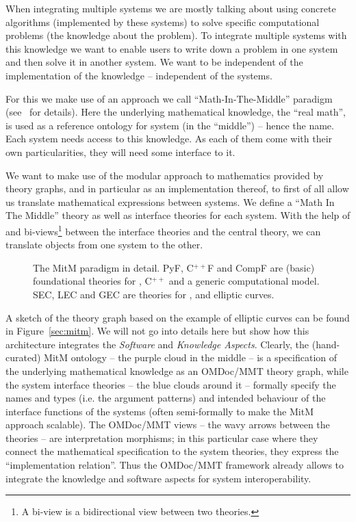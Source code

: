 When integrating multiple systems we are mostly talking about using concrete algorithms
(implemented by these systems) to solve specific computational problems (the knowledge
about the problem). To integrate multiple systems with this knowledge we want to enable
users to write down a problem in one system and then solve it in another system. We want
to be independent of the implementation of the knowledge -- independent of the systems.

For this we make use of an approach we call ``Math-In-The-Middle'' paradigm
(see~\cite{DehKohKon:iop16} for details). Here the underlying mathematical knowledge, the
``real math'', is used as a reference ontology for system (in the ``middle'') -- hence the
name. Each system needs access to this knowledge. As each of them come with their own
particularities, they will need some interface to it.

We want to make use of the modular approach to mathematics provided by theory graphs, and
in particular \MMT as an implementation thereof, to first of all allow us translate
mathematical expressions between systems. We define a ``Math In The Middle'' theory as
well as interface theories for each system. With the help of \MMT and bi-views\footnote{A
  bi-view is a bidirectional view between two theories. } between the interface theories and
the central theory, we can translate objects from one system to the other.

\begin{figure}[ht]\centering
  \def\myxscale{3}\def\myyscale{1.2}
  
  \caption{The MitM paradigm in detail. PyF, C${}^{++}$F and CompF are (basic)
    foundational theories for \python, C${}^{++}$ and a generic computational model. SEC,
    LEC and GEC are theories for \SageMath, \LMFDB and \GAP elliptic curves.}\label{fig:mitm}
\end{figure}

A sketch of the theory graph based on the example of elliptic curves can be found in
Figure~\ref{sec:mitm}. We will not go into details here but show how this architecture
integrates the \emph{Software} and \emph{Knowledge Aspects}. Clearly, the (hand-curated)
MitM ontology -- the purple cloud in the middle -- is a specification of the underlying
mathematical knowledge as an OMDoc/MMT theory graph, while the system interface theories
-- the blue clouds around it -- formally specify the names and types (i.e. the argument
patterns) and intended behaviour of the interface functions of the systems (often
semi-formally to make the MitM approach scalable). The OMDoc/MMT views -- the wavy arrows
between the theories -- are interpretation morphisms; in this particular case where they
connect the mathematical specification to the system theories, they express the
``implementation relation''. Thus the OMDoc/MMT framework already allows to integrate the
knowledge and software aspects for system interoperability.

